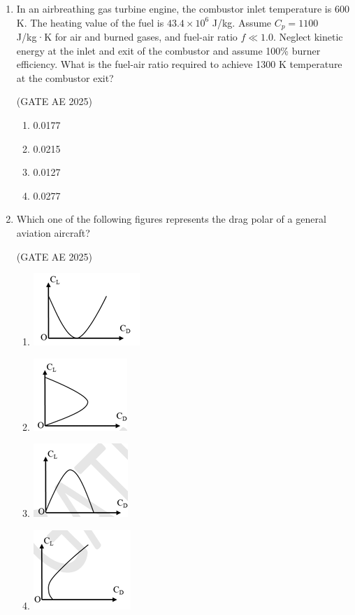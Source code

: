 \documentclass[journal,12pt,onecolumn]{IEEEtran}
\theoremstyle{remark}
\begin{document}
\begin{flushleft}
\begin{enumerate}
\item In an airbreathing gas turbine engine, the combustor inlet temperature is 600 K. The heating value of the fuel is $43.4 \times 10^6$ J/kg. Assume $C_p = 1100$ J/kg·K for air and burned gases, and fuel-air ratio $f \ll 1.0$. Neglect kinetic energy at the inlet and exit of the combustor and assume 100\% burner efficiency. What is the fuel-air ratio required to achieve 1300 K temperature at the combustor exit?

\hfill (GATE AE 2025)

\begin{enumerate}
    \item 0.0177
    \item 0.0215
    \item 0.0127
    \item 0.0277
\end{enumerate}

\item Which one of the following figures represents the drag polar of a general aviation aircraft? 

\hfill (GATE AE 2025)

\begin{enumerate}
    \item \includegraphics[width=0.2\columnwidth]{figs/A.png}
    \item \includegraphics[width=0.2\columnwidth]{figs/B.png}
    \item \includegraphics[width=0.2\columnwidth]{figs/C.png}
    \item \includegraphics[width=0.2\columnwidth]{figs/D.png}
\end{enumerate}


\end{enumerate}
\end{flushleft}
\end{document}
